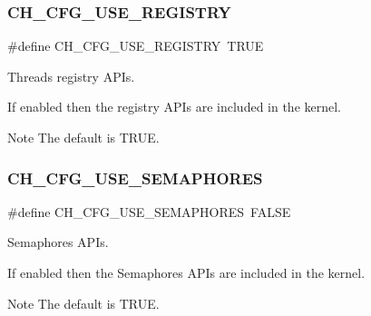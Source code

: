 \subsubsection{\texorpdfstring{C\+H\+\_\+\+C\+F\+G\+\_\+\+U\+S\+E\+\_\+\+R\+E\+G\+I\+S\+T\+RY}{CH\_CFG\_USE\_REGISTRY}}
{\footnotesize\ttfamily \#define C\+H\+\_\+\+C\+F\+G\+\_\+\+U\+S\+E\+\_\+\+R\+E\+G\+I\+S\+T\+RY~T\+R\+UE}



Threads registry A\+P\+Is. 

If enabled then the registry A\+P\+Is are included in the kernel.

\begin{DoxyNote}{Note}
The default is {\ttfamily T\+R\+UE}. 
\end{DoxyNote}
\hypertarget{group__config_gae66a111a6efc858624b42c8370b62cf6}{}\label{group__config_gae66a111a6efc858624b42c8370b62cf6} 
\subsubsection{\texorpdfstring{C\+H\+\_\+\+C\+F\+G\+\_\+\+U\+S\+E\+\_\+\+S\+E\+M\+A\+P\+H\+O\+R\+ES}{CH\_CFG\_USE\_SEMAPHORES}}
{\footnotesize\ttfamily \#define C\+H\+\_\+\+C\+F\+G\+\_\+\+U\+S\+E\+\_\+\+S\+E\+M\+A\+P\+H\+O\+R\+ES~F\+A\+L\+SE}



Semaphores A\+P\+Is. 

If enabled then the Semaphores A\+P\+Is are included in the kernel.

\begin{DoxyNote}{Note}
The default is {\ttfamily T\+R\+UE}. 
\end{DoxyNote}
\hypertarget{group__config_ga04e4e037498950df8bdef88bdd199494}{}\label{group__config_ga04e4e037498950df8bdef88bdd199494} 
